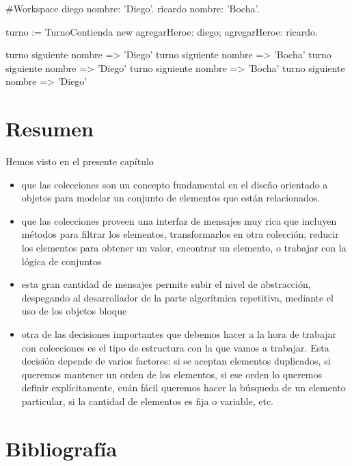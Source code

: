 \documentclass[a4paper,12pt]{book}
\begin{document}
{\begin{code}
#Workspace
diego nombre: 'Diego'.
ricardo nombre: 'Bocha'.

turno := TurnoContienda new 
   agregarHeroe: diego;
   agregarHeroe: ricardo.

turno siguiente nombre => 'Diego'
turno siguiente nombre => 'Bocha'
turno siguiente nombre => 'Diego'
turno siguiente nombre => 'Bocha'
turno siguiente nombre => 'Diego'
\end{code}

\section{Resumen}

Hemos visto en el presente capítulo

\begin{itemize}
 \item que las colecciones son un concepto fundamental en el diseño orientado a objetos para modelar un conjunto
 de elementos que están relacionados. 
 \item que las colecciones proveen una interfaz de mensajes muy rica que incluyen métodos para
 filtrar los elementos, transformarlos en otra colección, reducir los elementos para obtener
 un valor, encontrar un elemento, o trabajar con la lógica de conjuntos
 \item esta gran cantidad de mensajes permite subir el nivel de abstracción, despegando al desarrollador de la
 parte algorítmica repetitiva, mediante el uso de los objetos bloque
 \item otra de las decisiones importantes que debemos hacer a la hora de trabajar con colecciones es el tipo
 de estructura con la que vamos a trabajar. Esta decisión depende de varios factores: si se aceptan elementos
 duplicados, si queremos mantener un orden de los elementos, si ese orden lo queremos definir explícitamente,
 cuán fácil queremos hacer la búsqueda de un elemento particular, si la cantidad de elementos es fija o variable,
 etc.
\end{itemize}


\section{Bibliografía}

}
\end{document}
